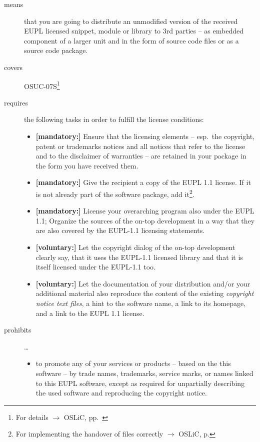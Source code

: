 \begin{description}

\item[means] that you are going to distribute an unmodified version of the
received EUPL licensed snippet, module or library to 3rd parties -- as embedded
component of a larger unit and in the form of source code files or as a source
code package.

\item[covers] OSUC-07S\footnote{For details $\rightarrow$
OSLiC, pp.\ \pageref{OSUC-07S-DEF}}

\item[requires] the following tasks in order to fulfill the license conditions:
\begin{itemize}
  
  \item \textbf{[mandatory:]} Ensure that the licensing elements -- esp.\ the
  copyright, patent or trademarks notices and all notices that refer to the
  license and to the disclaimer of warranties -- are retained in your package in
  the form you have received them.
  
  \item \textbf{[mandatory:]} Give the recipient a copy of the EUPL 1.1
  license. If it is not already part of the software package, add
  it\footnote{For implementing the handover of files correctly $\rightarrow$
  OSLiC, p. \pageref{DistributingFilesHint}}.
  
  \item \textbf{[mandatory:]} License your overarching program also under the
  EUPL 1.1; Organize the sources of the on-top development in a way that they
  are also covered by the EUPL-1.1 licensing statements.

  \item \textbf{[voluntary:]} Let the copyright dialog of the on-top development
  clearly say, that it uses the EUPL-1.1 licensed library and that it is itself
  licensed under the EUPL-1.1 too.
  
  \item \textbf{[voluntary:]} Let the documentation of your distribution and/or
  your additional material also reproduce the content of the existing
  \emph{copyright notice text files}, a hint to the software name, a link to its
  homepage, and a link to the EUPL 1.1 license.
\end{itemize}

\item[prohibits] \ldots
\begin{itemize}
  \item to promote any of your services or products -- based on the this software
  -- by trade names, trademarks, service marks, or names linked to this EUPL
  software, except as required for unpartially describing the used software and
  reproducing the copyright notice.
\end{itemize}

\end{description}


